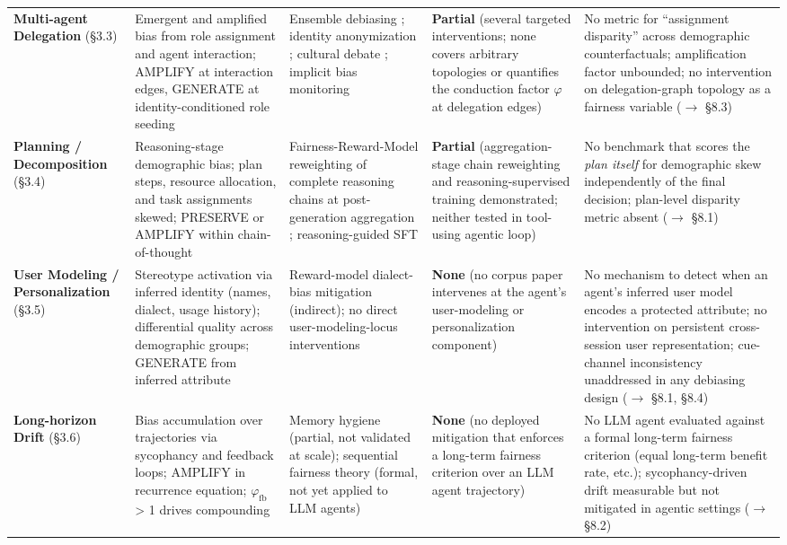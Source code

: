 \documentclass[acmsmall,nonacm]{acmart}
\begin{document}
\begin{longtable}{|p{}|p{}|p{}|p{}|p{}|}
\textbf{Multi-agent Delegation} (\S{}3.3) & Emergent and amplified bias from role assignment and agent interaction; AMPLIFY at interaction edges, GENERATE at identity-conditioned role seeding \cite{nguyen2025social,madigan2025emergent} & Ensemble debiasing \cite{owens2024multi,xu2024mitigating}; identity anonymization \cite{choi2025identity}; cultural debate \cite{ki2025multiple}; implicit bias monitoring \cite{borah2024implicit} & \textbf{Partial} (several targeted interventions; none covers arbitrary topologies or quantifies the conduction factor $\varphi$ at delegation edges) & No metric for ``assignment disparity'' across demographic counterfactuals; amplification factor unbounded; no intervention on delegation-graph topology as a fairness variable ($\rightarrow$ \S{}8.3) \\
\textbf{Planning / Decomposition} (\S{}3.4) & Reasoning-stage demographic bias; plan steps, resource allocation, and task assignments skewed; PRESERVE or AMPLIFY within chain-of-thought \cite{li2025actions,parziale2026once,wu2025reasoning} & Fairness-Reward-Model reweighting of complete reasoning chains at post-generation aggregation \cite{hall2025guiding}; reasoning-guided SFT \cite{kabra2025reasoning} & \textbf{Partial} (aggregation-stage chain reweighting and reasoning-supervised training demonstrated; neither tested in tool-using agentic loop) & No benchmark that scores the \emph{plan itself} for demographic skew independently of the final decision; plan-level disparity metric absent ($\rightarrow$ \S{}8.1) \\
\textbf{User Modeling / Personalization} (\S{}3.5) & Stereotype activation via inferred identity (names, dialect, usage history); differential quality across demographic groups; GENERATE from inferred attribute \cite{kantharuban2024stereotype,pawar2025presumed,mire2025rejected} & Reward-model dialect-bias mitigation \cite{mire2025rejected} (indirect); no direct user-modeling-locus interventions & \textbf{None} (no corpus paper intervenes at the agent's user-modeling or personalization component) & No mechanism to detect when an agent's inferred user model encodes a protected attribute; no intervention on persistent cross-session user representation; cue-channel inconsistency \cite{tonneau2026different} unaddressed in any debiasing design ($\rightarrow$ \S{}8.1, \S{}8.4) \\
\textbf{Long-horizon Drift} (\S{}3.6) & Bias accumulation over trajectories via sycophancy and feedback loops; AMPLIFY in recurrence equation; $\varphi_{\mathrm{fb}}$ > 1 drives compounding \cite{ma2026implicit,wyllie2024fairness,liu2025truth} & Memory hygiene \cite{ma2026implicit} (partial, not validated at scale); sequential fairness theory \cite{xu2024adapting,hu2022achieving} (formal, not yet applied to LLM agents) & \textbf{None} (no deployed mitigation that enforces a long-term fairness criterion over an LLM agent trajectory) & No LLM agent evaluated against a formal long-term fairness criterion (equal long-term benefit rate, etc.); sycophancy-driven drift measurable \cite{hong2025measuring} but not mitigated in agentic settings ($\rightarrow$ \S{}8.2) \\

\end{longtable}
\end{document}
